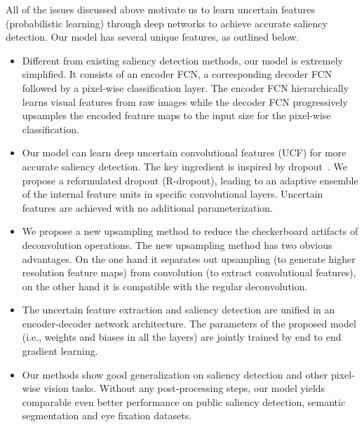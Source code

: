 \documentclass[10pt,twocolumn,letterpaper]{article}
\begin{document}
All of the issues discussed above motivate us to learn uncertain features (probabilistic learning) through deep networks to achieve accurate saliency detection. Our model has several unique features, as outlined below.
\begin{itemize}
\vspace{-3mm}
 \item
Different from existing saliency detection methods, our model is extremely simplified.
It consists of an encoder FCN, a corresponding decoder FCN followed by a pixel-wise classification layer.
The encoder FCN hierarchically learns visual features from raw images while the decoder FCN progressively upsamples the encoded feature maps to the input size for the pixel-wise classification.
\vspace{-3mm}
 \item
Our model can learn deep uncertain convolutional features (UCF) for more accurate saliency detection.
The key ingredient is inspired by dropout~\cite{hinton2012improving}.
We propose a reformulated dropout (R-dropout), leading to an adaptive ensemble of the internal feature units in specific convolutional layers.
Uncertain features are achieved with no additional parameterization.
 \vspace{-3mm}
 \item
We propose a new upsampling method to reduce the checkerboard artifacts of deconvolution operations.
The new upsampling method has two obvious advantages. On the one hand it separates out upsampling (to generate higher resolution feature maps) from convolution (to extract convolutional features), on the other hand it is compatible with the regular deconvolution.
\vspace{-3mm}
\item
The uncertain feature extraction and saliency detection are unified in an encoder-decoder network architecture.
The parameters of the proposed model (i.e., weights and biases in all the layers) are jointly trained by end to end gradient learning.
\vspace{-3mm}
\item
Our methods show good generalization on saliency detection and other pixel-wise vision tasks.
Without any post-processing steps, our model yields comparable even better performance on public saliency detection, semantic segmentation and eye fixation datasets.
\end{itemize}
\end{document}
